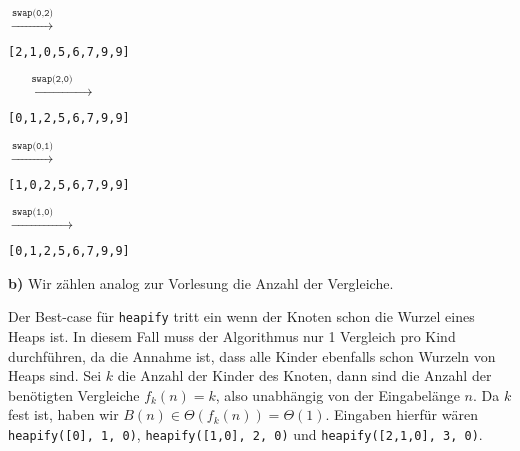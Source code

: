 \documentclass[a4paper,graphics,11pt]{article}
\begin{document}
$\xrightarrow{\texttt{swap(0,2)}}$
\begin{minipage}{0.3\textwidth}
    \texttt{[2,1,0,5,6,7,9,9]}\\
\end{minipage}
$\xrightarrow{\qquad\texttt{swap(2,0)}\qquad}$
\begin{minipage}{0.3\textwidth}
    \texttt{[0,1,2,5,6,7,9,9]}\\
    \begin{center}
    \end{center}
\end{minipage}

$\xrightarrow{\texttt{swap(0,1)}}$
\begin{minipage}{0.3\textwidth}
    \texttt{[1,0,2,5,6,7,9,9]}\\
    \begin{center}
    \end{center}
\end{minipage}
$\xrightarrow{\texttt{swap(1,0)}\qquad}$
\begin{minipage}{0.3\textwidth}
    \texttt{[0,1,2,5,6,7,9,9]}\\
    \begin{center}
    \end{center}
\end{minipage}

\textbf{b)}
Wir zählen analog zur Vorlesung die Anzahl der Vergleiche.

Der Best-case für \texttt{heapify} tritt ein wenn der Knoten schon die
Wurzel eines Heaps ist. In diesem Fall muss der Algorithmus nur 1 Vergleich pro Kind durchführen, da die Annahme ist,
dass alle Kinder ebenfalls schon Wurzeln von Heaps sind.
Sei $k$ die Anzahl der Kinder des Knoten, dann sind die Anzahl der benötigten Vergleiche $f_k(n) = k$, also
unabhängig von der Eingabelänge $n$. Da $k$ fest ist, haben wir $B(n) \in \Theta(f_k(n)) = \Theta(1)$.
Eingaben hierfür wären \texttt{heapify([0], 1, 0)}, \texttt{heapify([1,0], 2, 0)} und \texttt{heapify([2,1,0], 3, 0)}.
\end{document}
